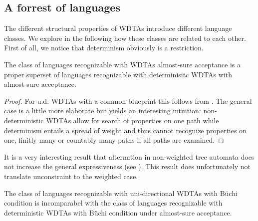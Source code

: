 \subsection{A forrest of languages}
The different structural properties of \acp{WDTA} introduce different language
classes. We explore in the following how these classes are related to each
other. First of all, we notice that determinism obviously is a restriction.
\begin{proposition}
  The class of languages recognizable with \acp{WDTA} almost-sure acceptance
  is a proper superset of languages recognizable with determinisitc \acp{WDTA}
  with almost-sure acceptance.
\end{proposition}
\begin{proof}
  For u.d. \acp{WDTA} with a common blueprint this follows from
  \cite[Proposition 10]{RandAutoInfTrees}.
  The general case is a little more elaborate but yields an interesting
  intuition: non-deterministic \acp{WDTA} allow for search of properties on
  one path while determinism entails a spread of weight and thus cannot
  recognize properties on one, finitly many or countably many paths if all
  paths are examined. 
\end{proof}
It is a very interesting result that alternation in non-weighted tree automata
does not increase the general expressiveness (see \cite{MullerSchupp}).
This result does unfortunately not translate unconstraint to the weighted case.
\begin{proposition}
  The class of languages recognizable with uni-directional \acp{WDTA} with
  Büchi condition is incomparabel with the class of languages recognizable with
  deterministic \acp{WDTA} with Büchi condition under almost-sure acceptance.
\end{proposition}
